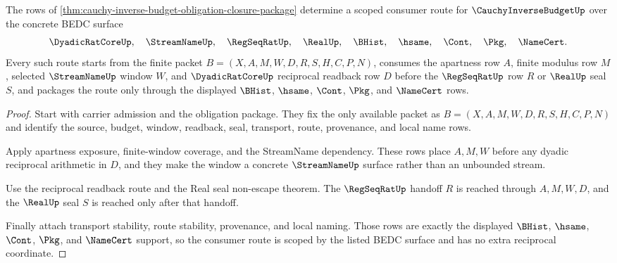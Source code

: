 \begin{theorem}
\label{thm:cauchy-inverse-budget-scoped-consumer-route-package}
The rows of \autoref{thm:cauchy-inverse-budget-obligation-closure-package} determine a scoped consumer route for $\CauchyInverseBudgetUp$ over the concrete BEDC surface
$$
\DyadicRatCoreUp,\quad \StreamNameUp,\quad \RegSeqRatUp,\quad \RealUp,\quad \BHist,\quad \hsame,\quad \Cont,\quad \Pkg,\quad \NameCert.
$$
Every such route starts from the finite packet $B=(X,A,M,W,D,R,S,H,C,P,N)$, consumes the apartness row $A$, finite modulus row $M$, selected $\StreamNameUp$ window $W$, and $\DyadicRatCoreUp$ reciprocal readback row $D$ before the $\RegSeqRatUp$ row $R$ or $\RealUp$ seal $S$, and packages the route only through the displayed $\BHist$, $\hsame$, $\Cont$, $\Pkg$, and $\NameCert$ rows.
\end{theorem}
\begin{proof}
Start with carrier admission and the obligation package. They fix the only available packet as $B=(X,A,M,W,D,R,S,H,C,P,N)$ and identify the source, budget, window, readback, seal, transport, route, provenance, and local name rows.

Apply apartness exposure, finite-window coverage, and the StreamName dependency. These rows place $A,M,W$ before any dyadic reciprocal arithmetic in $D$, and they make the window a concrete $\StreamNameUp$ surface rather than an unbounded stream.

Use the reciprocal readback route and the Real seal non-escape theorem. The $\RegSeqRatUp$ handoff $R$ is reached through $A,M,W,D$, and the $\RealUp$ seal $S$ is reached only after that handoff.

Finally attach transport stability, route stability, provenance, and local naming. Those rows are exactly the displayed $\BHist$, $\hsame$, $\Cont$, $\Pkg$, and $\NameCert$ support, so the consumer route is scoped by the listed BEDC surface and has no extra reciprocal coordinate.
\end{proof}

